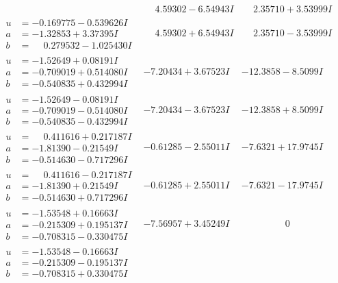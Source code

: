 \documentclass[1p]{elsarticle_modified}
\theoremstyle{definition}
\begin{document}
$$\begin{array}{c|c|c}
 & \phantom{-}4.59302 - 6.54943 I & \phantom{-}2.35710 + 3.53999 I \\ \hline\begin{aligned}
u &= -0.169775 - 0.539626 I \\
a &= -1.32853 + 3.37395 I \\
b &= \phantom{-}0.279532 - 1.025430 I\end{aligned}
 & \phantom{-}4.59302 + 6.54943 I & \phantom{-}2.35710 - 3.53999 I \\ \hline\begin{aligned}
u &= -1.52649 + 0.08191 I \\
a &= -0.709019 + 0.514080 I \\
b &= -0.540835 + 0.432994 I\end{aligned}
 & -7.20434 + 3.67523 I & -12.3858 - 8.5099 I \\ \hline\begin{aligned}
u &= -1.52649 - 0.08191 I \\
a &= -0.709019 - 0.514080 I \\
b &= -0.540835 - 0.432994 I\end{aligned}
 & -7.20434 - 3.67523 I & -12.3858 + 8.5099 I \\ \hline\begin{aligned}
u &= \phantom{-}0.411616 + 0.217187 I \\
a &= -1.81390 - 0.21549 I \\
b &= -0.514630 - 0.717296 I\end{aligned}
 & -0.61285 - 2.55011 I & -7.6321 + 17.9745 I \\ \hline\begin{aligned}
u &= \phantom{-}0.411616 - 0.217187 I \\
a &= -1.81390 + 0.21549 I \\
b &= -0.514630 + 0.717296 I\end{aligned}
 & -0.61285 + 2.55011 I & -7.6321 - 17.9745 I \\ \hline\begin{aligned}
u &= -1.53548 + 0.16663 I \\
a &= -0.215309 + 0.195137 I \\
b &= -0.708315 - 0.330475 I\end{aligned}
 & -7.56957 + 3.45249 I & \phantom{-0.000000 } 0 \\ \hline\begin{aligned}
u &= -1.53548 - 0.16663 I \\
a &= -0.215309 - 0.195137 I \\
b &= -0.708315 + 0.330475 I\end{aligned}

\end{array}$$
\end{document}
